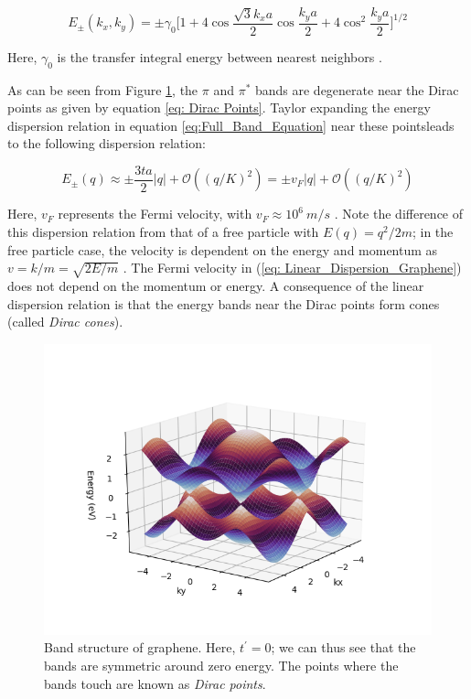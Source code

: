 \documentclass[]{article}
\begin{document}
\begin{equation}
	E_{\pm}(k_x, k_y) = \pm\gamma_0 \bigg [ 1 + 4\cos \frac{\sqrt{3}k_x a}{2}\cos \frac{k_y a}{2} + 4\cos^2 \frac{k_y a}{2} \bigg ]^{1/2}
\end{equation}

Here, $\gamma_0$ is the transfer integral energy between nearest neighbors \cite{Properties_of_graphene:_a_theoretical_perspective}. 
\newline

As can be seen from Figure \ref{fig: Graphene Band}, the $\pi$ and $\pi^*$ bands are degenerate near the Dirac points as given by equation \ref{eq: Dirac Points}. Taylor expanding the energy dispersion relation in equation \ref{eq:Full_Band_Equation} near these points\footnotemark leads to the following dispersion relation:

\begin{equation}\label{eq: Linear_Dispersion_Graphene}
	E_{\pm}(q) \approx \pm \frac{3ta}{2} |q| + \mathcal{O}((q/K)^2) = \pm v_F |q| + \mathcal{O}((q/K)^2)
\end{equation}


Here, $v_F$ represents the Fermi velocity, with $v_F \approx 10^6 \ m/s$ \cite{Wallace_1947_Band_Theory_Graphite}. Note the difference of this dispersion relation from that of a free particle with $E(q) = q^2/2m$; in the free particle case, the velocity is dependent on the energy and momentum as $v = k/m = \sqrt{2E/m}$ \cite{The_Electronic_Properties_of_Graphene}. The Fermi velocity in (\ref{eq: Linear_Dispersion_Graphene}) does not depend on the momentum or energy. A consequence of the linear dispersion relation is that the energy bands near the Dirac points form cones (called \textit{Dirac cones}).

\begin{figure}[htb]
	\centering
	\includegraphics[scale = 0.7]{Graphene_Band_Structure.PNG}
	\caption{Band structure of graphene. Here, $t^{'} = 0$; we can thus see that the bands are symmetric around zero energy. The points where the bands touch are known as \textit{Dirac points}. }
	\label{fig: Graphene Band}
\end{figure}
\end{document}

